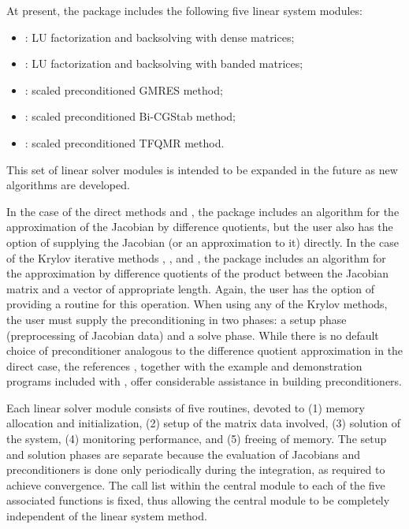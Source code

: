 At present, the package includes the following five {\idas} linear system
modules:
\begin{itemize} 
\item {\idadense}: LU factorization and backsolving with dense matrices; 
\item {\idaband}: LU factorization and backsolving with banded matrices; 
\item {\idaspgmr}: scaled preconditioned GMRES method;
\item {\idaspbcg}: scaled preconditioned Bi-CGStab method;
\item {\idasptfqmr}: scaled preconditioned TFQMR method.
\end{itemize}
This set of linear solver modules is intended to be expanded in the
future as new algorithms are developed.

In the case of the direct methods {\idadense} and {\idaband}, the package includes
an algorithm for the approximation of the Jacobian by difference
quotients, but the user also has the option of supplying the Jacobian
(or an approximation to it) directly. In the case of the Krylov iterative methods
{\idaspgmr}, {\idaspbcg}, and {\idasptfqmr}, the package includes an algorithm for
the approximation by difference quotients of the product between the Jacobian matrix
and a vector of appropriate length. Again, the user has the option of providing
a routine for this operation.
When  using any of the Krylov
methods, the user must supply the preconditioning in two phases: 
a setup phase (preprocessing of Jacobian data) and a solve phase.
While there is no default
choice of preconditioner analogous to the difference quotient
approximation in the direct case, the references
\cite{BrHi:89, Byr:92}, together with
the example and demonstration programs included with {\idas}, offer
considerable assistance in building preconditioners.

Each {\idas} linear solver module consists of five routines, devoted to
(1) memory allocation and initialization, (2) setup of the matrix data
involved, (3) solution of the system, (4) monitoring performance,
and (5) freeing of memory.  
The setup and solution phases are separate because the evaluation of
Jacobians and preconditioners is done only periodically during the
integration, as required to achieve convergence. The call list within
the central {\idas} module to each of the five associated functions is
fixed, thus allowing the central module to be completely independent
of the linear system method.


